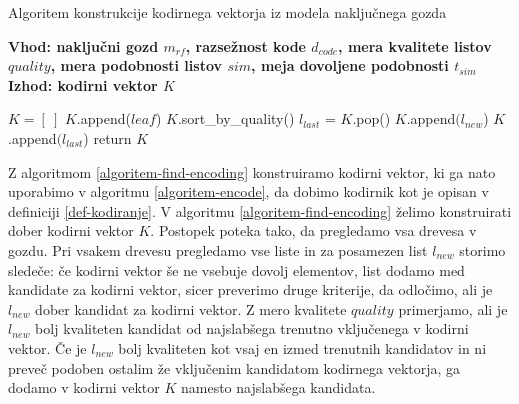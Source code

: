 \documentclass[12pt,a4paper]{article}
\begin{document}
\begin{algorithm}[h!]
  \caption{Algoritem konstrukcije kodirnega vektorja iz modela naključnega gozda}
  \label{algoritem-find-encoding}
  \raggedright
  \textbf{Vhod: naključni gozd $m_{rf}$, razsežnost kode $d_{code}$, mera kvalitete listov $quality$, mera podobnosti listov $sim$, meja dovoljene podobnosti $t_{sim}$}  \\
  \textbf{Izhod: kodirni vektor $K$} %
  \begin{algorithmic}[1]
	\State $K = [\ ]$
				\State $K$.append($leaf$)
			\EndIf
		\EndFor
	\EndFor
				\State $K$.sort\_by\_quality()
				\State $l_{last}$ = $K$.pop()
						\State $K$.append$(l_{new}$)
					\Else
						\State $K$.append$(l_{last}$)
					\EndIf
				\EndIf
			\EndIf
		\EndFor
	\EndFor	
	\State return $K$
  \end{algorithmic}
\end{algorithm}

Z algoritmom \ref{algoritem-find-encoding} konstruiramo kodirni vektor, ki ga nato uporabimo v algoritmu \ref{algoritem-encode}, 
da dobimo kodirnik kot je opisan v definiciji \ref{def-kodiranje}.
V algoritmu \ref{algoritem-find-encoding} želimo konstruirati dober kodirni vektor $K$. Postopek poteka tako, da pregledamo vsa drevesa v gozdu. 
Pri vsakem drevesu pregledamo vse liste in za posamezen list $l_{new}$ storimo sledeče: 
če kodirni vektor še ne vsebuje dovolj elementov, list dodamo med kandidate za kodirni vektor, sicer preverimo druge kriterije, da odločimo, ali je $l_{new}$ dober kandidat za kodirni vektor. 
Z mero kvalitete $quality$ primerjamo, ali je $l_{new}$ bolj kvaliteten kandidat od najslabšega trenutno vključenega v kodirni vektor. 
Če je $l_{new}$ bolj kvaliteten kot vsaj en izmed trenutnih kandidatov in ni preveč podoben ostalim že vključenim kandidatom kodirnega vektorja, ga dodamo v kodirni vektor $K$ namesto najslabšega kandidata.

\end{document}
